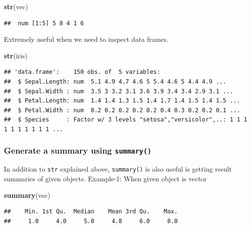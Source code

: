 \documentclass[
]{book}
\newenvironment{Shaded}{\begin{snugshade}}{\end{snugshade}}
\newcommand{\FunctionTok}[1]{\textcolor[rgb]{0.13,0.29,0.53}{\textbf{#1}}}
\newcommand{\NormalTok}[1]{#1}
\begin{document}
\begin{Shaded}
\begin{Highlighting}[]
\FunctionTok{str}\NormalTok{(vec)}
\end{Highlighting}
\end{Shaded}

\begin{verbatim}
##  num [1:5] 5 8 4 1 6
\end{verbatim}

Extremely useful when we need to inspect data frames.

\begin{Shaded}
\begin{Highlighting}[]
\FunctionTok{str}\NormalTok{(iris)}
\end{Highlighting}
\end{Shaded}

\begin{verbatim}
## 'data.frame':    150 obs. of  5 variables:
##  $ Sepal.Length: num  5.1 4.9 4.7 4.6 5 5.4 4.6 5 4.4 4.9 ...
##  $ Sepal.Width : num  3.5 3 3.2 3.1 3.6 3.9 3.4 3.4 2.9 3.1 ...
##  $ Petal.Length: num  1.4 1.4 1.3 1.5 1.4 1.7 1.4 1.5 1.4 1.5 ...
##  $ Petal.Width : num  0.2 0.2 0.2 0.2 0.2 0.4 0.3 0.2 0.2 0.1 ...
##  $ Species     : Factor w/ 3 levels "setosa","versicolor",..: 1 1 1 1 1 1 1 1 1 1 ...
\end{verbatim}

\hypertarget{generate-a-summary-using-summary}{%
\subsubsection*{\texorpdfstring{Generate a summary using \texttt{summary()}}{Generate a summary using summary()}}\label{generate-a-summary-using-summary}}

In addition to \texttt{str} explained above, \texttt{summary()} is also useful is getting result summaries of given objects. Example-1: When given object is vector

\begin{Shaded}
\begin{Highlighting}[]
\FunctionTok{summary}\NormalTok{(vec)}
\end{Highlighting}
\end{Shaded}

\begin{verbatim}
##    Min. 1st Qu.  Median    Mean 3rd Qu.    Max. 
##     1.0     4.0     5.0     4.8     6.0     8.0
\end{verbatim}
\end{document}
